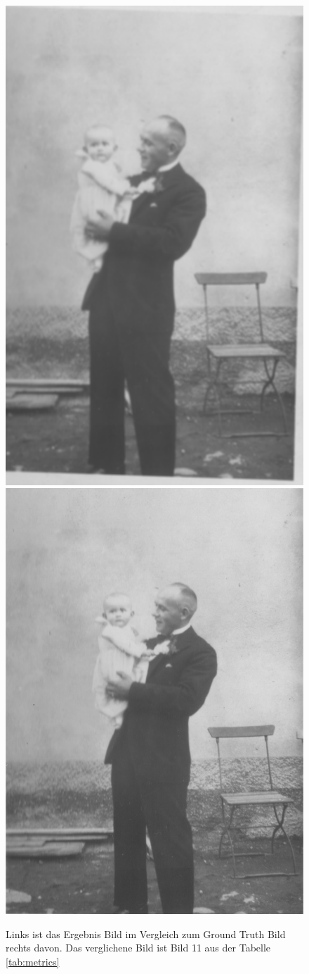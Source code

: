 \begin{figure}[h]
 	\centering
	\includegraphics[width=0.3\linewidth]{images/compare/03_0.png} \quad
	\includegraphics[width=0.33\linewidth]{images/compare/gt_03_0.png}
	\caption{Links ist das Ergebnis Bild im Vergleich zum Ground Truth Bild rechts davon. Das verglichene Bild ist Bild 11 aus der Tabelle \ref{tab:metrics}}
	\label{fig:compare_neg}
\end{figure}


